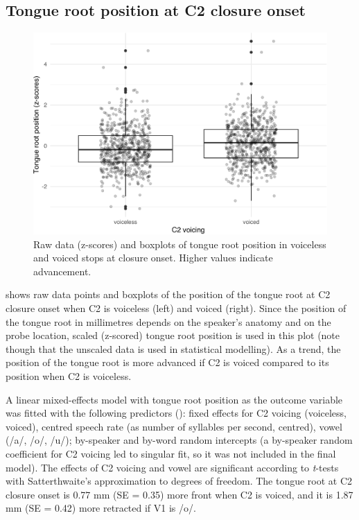 \documentclass[preprint]{JASAnew}
\begin{document}
\hypertarget{tongue-root-position-at-c2-closure-onset}{%
\subsection{Tongue root position at C2 closure
onset}\label{tongue-root-position-at-c2-closure-onset}}

\label{s:tra-lm}

\begin{figure}
\includegraphics[width=\linewidth]{./Figure2-1} \caption{Raw data (z-scores) and boxplots of tongue root position in voiceless and voiced stops at closure onset. Higher values indicate advancement.}\label{f:Figure2}
\end{figure}

 shows raw data points and boxplots of the position of
the tongue root at C2 closure onset when C2 is voiceless (left) and
voiced (right). Since the position of the tongue root in millimetres
depends on the speaker's anatomy and on the probe location, scaled
(z-scored) tongue root position is used in this plot (note though that
the unscaled data is used in statistical modelling). As a trend, the
position of the tongue root is more advanced if C2 is voiced compared to
its position when C2 is voiceless.

A linear mixed-effects model with tongue root position as the outcome
variable was fitted with the following predictors
(): fixed effects for C2 voicing (voiceless,
voiced), centred speech rate (as number of syllables per second,
centred), vowel (/a/, /o/, /u/); by-speaker and by-word random
intercepts (a by-speaker random coefficient for C2 voicing led to
singular fit, so it was not included in the final model). The effects of
C2 voicing and vowel are significant according to \emph{t}-tests with
Satterthwaite's approximation to degrees of freedom. The tongue root at
C2 closure onset is 0.77 mm (SE = 0.35) more front when C2 is voiced,
and it is 1.87 mm (SE = 0.42) more retracted if V1 is /o/.
\end{document}
